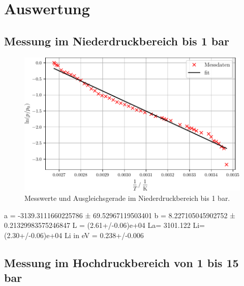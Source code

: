 \section{Auswertung}
\label{sec:Auswertung}
\subsection{Messung im Niederdruckbereich bis 1 bar} %
\label{sub:Niederdruck_aus}


\begin{figure}
  \centering
  \includegraphics[scale=0.7]{build/plot1.pdf}
  \caption{Messwerte und Ausgleichsgerade im Niederdruckbereich bis 1 bar.}
  \label{fig:plot1}
\end{figure}

a = -3139.3111660225786 ± 69.52967119503401
b = 8.227105045902752 ± 0.21329983575246847
L = (2.61+/-0.06)e+04
La= 3101.122
Li= (2.30+/-0.06)e+04
Li in eV = 0.238+/-0.006

\subsection{Messung im Hochdruckbereich von 1 bis 15 bar} %
\label{sub:Hochdruck_aus}


